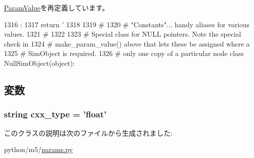 \hyperlink{classm5_1_1params_1_1ParamValue_a33ebe6cd32bcbd15465fc28b9d94bf82}{ParamValue}を再定義しています。


\begin{DoxyCode}
1316                      :
1317         return '%
1318 
1319 #
1320 # "Constants"... handy aliases for various values.
1321 #
1322 
1323 # Special class for NULL pointers.  Note the special check in
1324 # make_param_value() above that lets these be assigned where a
1325 # SimObject is required.
1326 # only one copy of a particular node
class NullSimObject(object):
\end{DoxyCode}


\subsection{変数}
\hypertarget{classm5_1_1params_1_1MemoryBandwidth_a2f1553ebb79374a68b36fdd6d8d82fc3}{
\subsubsection[{cxx\_\-type}]{\setlength{\rightskip}{0pt plus 5cm}string {\bf cxx\_\-type} = 'float'}}
\label{classm5_1_1params_1_1MemoryBandwidth_a2f1553ebb79374a68b36fdd6d8d82fc3}


このクラスの説明は次のファイルから生成されました:\begin{DoxyCompactItemize}
\item 
python/m5/\hyperlink{params_8py}{params.py}\end{DoxyCompactItemize}
